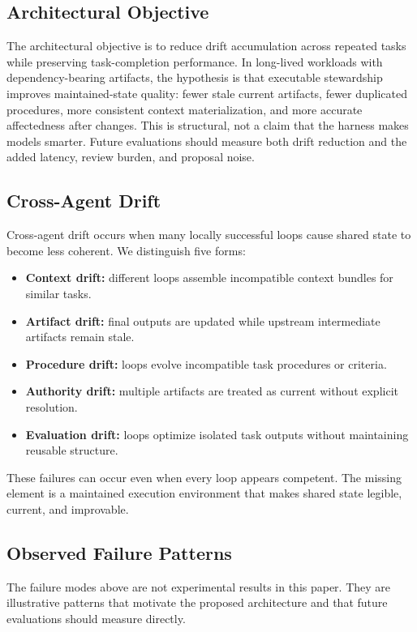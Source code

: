 \documentclass{article}
\begin{document}
\subsection{Architectural Objective}

The architectural objective is to reduce drift accumulation across repeated tasks while preserving task-completion performance. In long-lived workloads with dependency-bearing artifacts, the hypothesis is that executable stewardship improves maintained-state quality: fewer stale current artifacts, fewer duplicated procedures, more consistent context materialization, and more accurate affectedness after changes. This is structural, not a claim that the harness makes models smarter. Future evaluations should measure both drift reduction and the added latency, review burden, and proposal noise.

\subsection{Cross-Agent Drift}

Cross-agent drift occurs when many locally successful loops cause shared state to become less coherent. We distinguish five forms:
\begin{itemize}[leftmargin=*]
\item \textbf{Context drift:} different loops assemble incompatible context bundles for similar tasks.
\item \textbf{Artifact drift:} final outputs are updated while upstream intermediate artifacts remain stale.
\item \textbf{Procedure drift:} loops evolve incompatible task procedures or criteria.
\item \textbf{Authority drift:} multiple artifacts are treated as current without explicit resolution.
\item \textbf{Evaluation drift:} loops optimize isolated task outputs without maintaining reusable structure.
\end{itemize}

These failures can occur even when every loop appears competent. The missing element is a maintained execution environment that makes shared state legible, current, and improvable.

\subsection{Observed Failure Patterns}

The failure modes above are not experimental results in this paper. They are illustrative patterns that motivate the proposed architecture and that future evaluations should measure directly.
\end{document}
